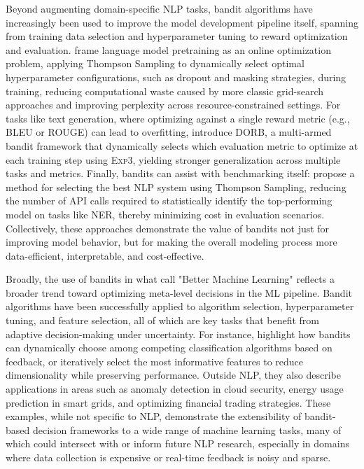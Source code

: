 \documentclass[11pt]{article}
\begin{document}
Beyond augmenting domain-specific NLP tasks, bandit algorithms have increasingly been used to improve the model development pipeline itself, spanning from training data selection and hyperparameter tuning to reward optimization and evaluation. \citet{urteaga-etal-2023-multi} frame language model pretraining as an online optimization problem, applying Thompson Sampling to dynamically select optimal hyperparameter configurations, such as dropout and masking strategies, during training, reducing computational waste caused by more classic grid-search approaches and improving perplexity across resource-constrained settings. For tasks like text generation, where optimizing against a single reward metric (e.g., BLEU or ROUGE) can lead to overfitting, \citet{pasunuru-etal-2020-dorb} introduce DORB, a multi-armed bandit framework that dynamically selects which evaluation metric to optimize at each training step using \textsc{Exp3}, yielding stronger generalization across multiple tasks and metrics. Finally, bandits can assist with benchmarking itself: \citet{haffari-etal-2017-efficient} propose a method for selecting the best NLP system using Thompson Sampling, reducing the number of API calls required to statistically identify the top-performing model on tasks like NER, thereby minimizing cost in evaluation scenarios. Collectively, these approaches demonstrate the value of bandits not just for improving model behavior, but for making the overall modeling process more data-efficient, interpretable, and cost-effective.

Broadly, the use of bandits in what \citet{bouneffouf2019surveypracticalapplicationsmultiarmed} call "Better Machine Learning" reflects a broader trend toward optimizing meta-level decisions in the ML pipeline. Bandit algorithms have been successfully applied to algorithm selection, hyperparameter tuning, and feature selection, all of which are key tasks that benefit from adaptive decision-making under uncertainty. For instance, \citet{bouneffouf2019surveypracticalapplicationsmultiarmed} highlight how bandits can dynamically choose among competing classification algorithms based on feedback, or iteratively select the most informative features to reduce dimensionality while preserving performance. Outside NLP, they also describe applications in areas such as anomaly detection in cloud security, energy usage prediction in smart grids, and optimizing financial trading strategies. These examples, while not specific to NLP, demonstrate the extensibility of bandit-based decision frameworks to a wide range of machine learning tasks, many of which could intersect with or inform future NLP research, especially in domains where data collection is expensive or real-time feedback is noisy and sparse.
\end{document}
